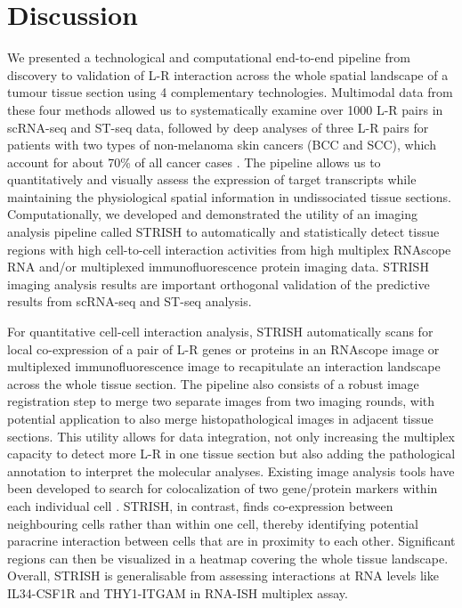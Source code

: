 
\section{Discussion}
We presented a technological and computational end-to-end pipeline from discovery to validation of L-R interaction across the whole spatial landscape of a tumour tissue section using 4 complementary technologies. Multimodal data from these four methods allowed us to systematically examine over 1000 L-R pairs in scRNA-seq and ST-seq data, followed by deep analyses of three L-R pairs for patients with two types of non-melanoma skin cancers (BCC and SCC), which account for about 70\% of all cancer cases \cite{garcovich2017skin}. The pipeline allows us to quantitatively and visually assess the expression of target transcripts while maintaining the physiological spatial information in undissociated tissue sections. Computationally, we developed and demonstrated the utility of an imaging analysis pipeline called STRISH to automatically and statistically detect tissue regions with high cell-to-cell interaction activities from high multiplex RNAscope RNA and/or multiplexed immunofluorescence protein imaging data. STRISH imaging analysis results are important orthogonal validation of the predictive results from scRNA-seq and ST-seq analysis.  

For quantitative cell-cell interaction analysis, STRISH automatically scans for local co-expression of a pair of L-R genes or proteins in an RNAscope image or multiplexed immunofluorescence image to recapitulate an interaction landscape across the whole tissue section. The pipeline also consists of a robust image registration step to merge two separate images from two imaging rounds, with potential application to also merge histopathological images in adjacent tissue sections. This utility allows for data integration, not only increasing the multiplex capacity to detect more L-R in one tissue section but also adding the pathological annotation to interpret the molecular analyses. Existing image analysis tools have been developed to search for colocalization of two gene/protein markers within each individual cell \cite{bolte2006guided}. STRISH, in contrast, finds co-expression between neighbouring cells rather than within one cell, thereby identifying potential paracrine interaction between cells that are in proximity to each other. Significant regions can then be visualized in a heatmap covering the whole tissue landscape. Overall, STRISH is generalisable from assessing interactions at RNA levels like IL34-CSF1R and THY1-ITGAM in RNA-ISH multiplex assay.

